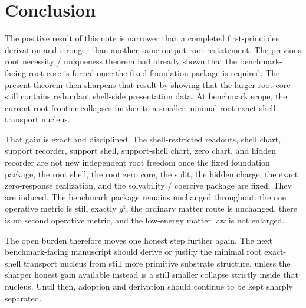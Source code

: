 \documentclass[11pt]{article}
\newcommand{\CompletedMetric}{g^{\sharp}}
\begin{document}
\section{Conclusion}

The positive result of this note is narrower than a completed first-principles derivation and stronger than another same-output root restatement. The previous root necessity / uniqueness theorem had already shown that the benchmark-facing root core is forced once the fixed foundation package is required. The present theorem then sharpens that result by showing that the larger root core still contains redundant shell-side presentation data. At benchmark scope, the current root frontier collapses further to a smaller minimal root exact-shell transport nucleus.

That gain is exact and disciplined. The shell-restricted readouts, shell chart, support recorder, support shell, support-shell chart, zero chart, and hidden recorder are not new independent root freedom once the fixed foundation package, the root shell, the root zero core, the split, the hidden charge, the exact zero-response realization, and the solvability / coercive package are fixed. They are induced. The benchmark package remains unchanged throughout: the one operative metric is still exactly \(\CompletedMetric\), the ordinary matter route is unchanged, there is no second operative metric, and the low-energy matter law is not enlarged.

The open burden therefore moves one honest step further again. The next benchmark-facing manuscript should derive or justify the minimal root exact-shell transport nucleus from still more primitive substrate structure, unless the sharper honest gain available instead is a still smaller collapse strictly inside that nucleus. Until then, adoption and derivation should continue to be kept sharply separated.
\end{document}
